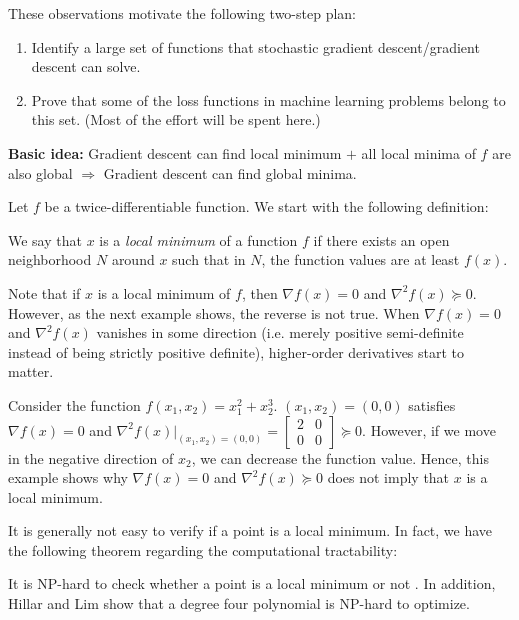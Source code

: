These observations motivate the following two-step plan:

\begin{enumerate}
    \item Identify a large set of functions that stochastic gradient descent/gradient descent can solve.
    \item Prove that some of the loss functions in machine learning problems belong to this set. (Most of the effort will be spent here.)
\end{enumerate}
\textbf{Basic idea:} Gradient descent can find local minimum $+$ all local minima of $f$ are also global $\Rightarrow$ Gradient descent can find global minima.

 \label{sec:optim_convergence}
Let $f$ be a twice-differentiable function. We start with the following definition:
\begin{definition} 
We say that $x$ is a \textit{local minimum} of a function $f$ if there exists an open neighborhood $N$ around $x$ such that in $N$, the function values are at least $f(x)$.
\end{definition}

Note that if $x$ is a local minimum of $f$, then $\nabla f(x) = 0$ and $\nabla^2 f(x) \succeq 0$. However, as the next example shows, the reverse is not true. When $\nabla f(x) = 0$ and $\nabla^2 f(x)$ vanishes in some direction (i.e. merely positive semi-definite instead of being strictly positive definite), higher-order derivatives start to matter.

\begin{example}
\label{lec10:ex:counterexample}
Consider the function $f(x_1, x_2) = x_1^2 + x_2^3$. $(x_1, x_2) = (0, 0)$ satisfies $\nabla f(x) = 0$ and $\nabla^2 f(x)|_{(x_1, x_2) = (0, 0)} = \begin{bmatrix} 2 & 0 \\
0 & 0\end{bmatrix} \succeq 0$. However, if we move in the negative direction of $x_2$, we can decrease the function value. Hence, this example shows why $\nabla f(x) = 0$ and $\nabla^2 f(x) \succeq 0$ does not imply that $x$ is a local minimum.
\end{example}

It is generally not easy to verify if a point is a local minimum. In fact, we have the following theorem regarding the computational tractability:
\begin{theorem}
\label{lec10:thm:np_hard}
It is NP-hard to check whether a point is a local minimum or not \cite{murty1987}. In addition, Hillar and Lim \cite{hillar2013} show that a degree four polynomial is NP-hard to optimize.
\end{theorem}

